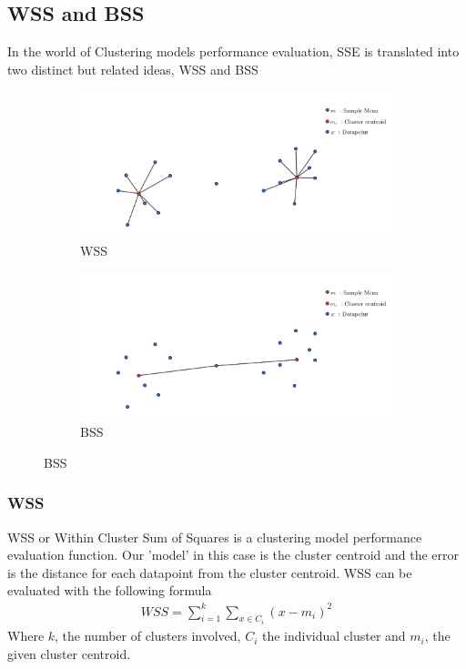 \documentclass[12pt]{article}
\begin{document}
		 	\subsection*{WSS and BSS}
		 		In the world of Clustering models performance evaluation, SSE is translated into two distinct but related ideas\cite{???}, WSS and BSS
				\begin{figure}[H]
					\centering
					\begin{subfigure}{0.4\textwidth}
						\includegraphics[width=\textwidth]{res/WSS}
						\caption{WSS}
						\label{fig:first}
					\end{subfigure}
					\hfill
					\begin{subfigure}{0.4\textwidth}
					\includegraphics[width=\textwidth]{res/BSS}
						\caption{BSS}
						\label{fig:second}
					\end{subfigure}
					\hfill
					\label{fig:figures}
				\end{figure}
		 		\subsubsection*{WSS}
		 			WSS or  Within Cluster Sum of Squares is a clustering model performance evaluation function. Our 'model' in this case is the cluster centroid and the error is the distance for each datapoint from the cluster centroid. WSS can be evaluated with the following formula\cite{???}
		 			\begin{align}
						WSS = \sum_{i=1}^{k}{\sum_{x\in{C_i}}^{}{(x-m_i)^2}}
		 			\end{align}
	 				Where $k$, the number of clusters involved, $C_i$ the individual cluster and $m_i$, the given cluster centroid.
\end{document}
